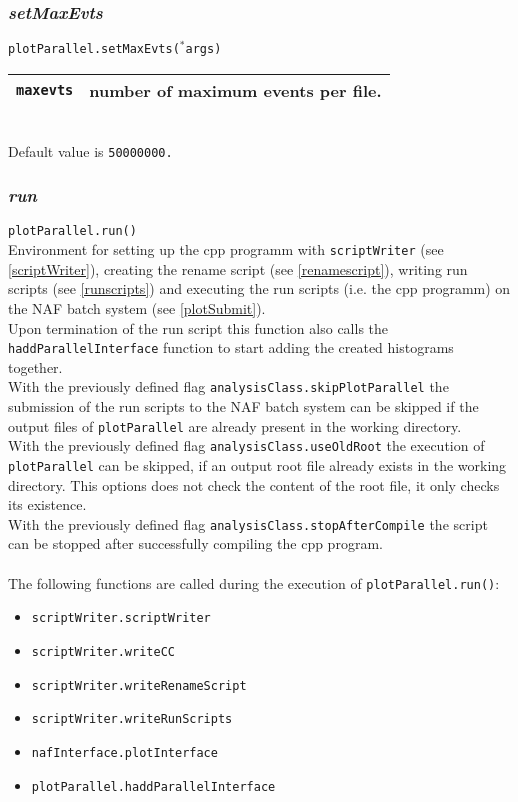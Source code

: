 \documentclass[12pt, a4paper]{article}
\newcommand{\args}{$^*$args}
\begin{document}
\subsubsection{\textit{setMaxEvts}}
\texttt{plotParallel.setMaxEvts(\args)}\\
\begin{tabular}{r|l}
\hline
\texttt{maxevts}	&	number of maximum events per file.\\
\hline
\end{tabular}
\\
Default value is \texttt{50000000.}




\subsubsection{\textit{run}}
\texttt{plotParallel.run()}\\
Environment for setting up the cpp programm with \texttt{scriptWriter} (see \ref{scriptWriter}), creating the rename script (see \ref{renamescript}), writing run scripts (see \ref{runscripts}) and executing the run scripts (i.e. the cpp programm) on the NAF batch system (see \ref{plotSubmit}).\\
Upon termination of the run script this function also calls the \texttt{haddParallelInterface} function to start adding the created histograms together.\\
With the previously defined flag \texttt{analysisClass.skipPlotParallel} the submission of the run scripts to the NAF batch system can be skipped if the output files of \texttt{plotParallel} are already present in the working directory.\\
With the previously defined flag \texttt{analysisClass.useOldRoot} the execution of \texttt{plotParallel} can be skipped, if an output root file already exists in the working directory. This options does not check the content of the root file, it only checks its existence.\\
With the previously defined flag \texttt{analysisClass.stopAfterCompile} the script can be stopped after successfully compiling the cpp program.\\
~\\
The following functions are called during the execution of \texttt{plotParallel.run()}:
\begin{itemize}
\itemsep-0.5em
\item \texttt{scriptWriter.scriptWriter}
\item \texttt{scriptWriter.writeCC}
\item \texttt{scriptWriter.writeRenameScript}
\item \texttt{scriptWriter.writeRunScripts}
\item \texttt{nafInterface.plotInterface}
\item \texttt{plotParallel.haddParallelInterface}
\end{itemize}
\end{document}
